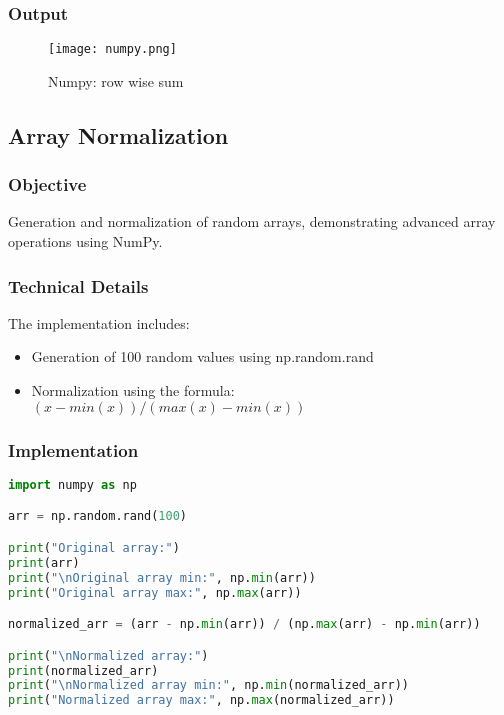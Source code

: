 \documentclass[12pt]{article}
\begin{document}
\subsubsection{Output}
\begin{figure}[h]
    \centering
    \texttt{[image: numpy.png]}
    \caption{Numpy: row wise sum}
    \label{fig:enter-label}
\end{figure}
\subsection{Array Normalization\hfill\href{https://github.com/sabbirahmed404/Python-Practice/blob/main/numpy_2.py}{\faGithub}}
\subsubsection{Objective}
Generation and normalization of random arrays, demonstrating advanced array operations using NumPy.

\subsubsection{Technical Details}
The implementation includes:
\begin{itemize}
    \item Generation of 100 random values using np.random.rand
    \item Normalization using the formula: $(x - min(x)) / (max(x) - min(x))$
\end{itemize}

\subsubsection{Implementation}
\begin{lstlisting}[language=Python, caption=Array Normalization Implementation]
import numpy as np

arr = np.random.rand(100)

print("Original array:")
print(arr)
print("\nOriginal array min:", np.min(arr))
print("Original array max:", np.max(arr))

normalized_arr = (arr - np.min(arr)) / (np.max(arr) - np.min(arr))

print("\nNormalized array:")
print(normalized_arr)
print("\nNormalized array min:", np.min(normalized_arr))
print("Normalized array max:", np.max(normalized_arr))
\end{lstlisting}
\end{document}
